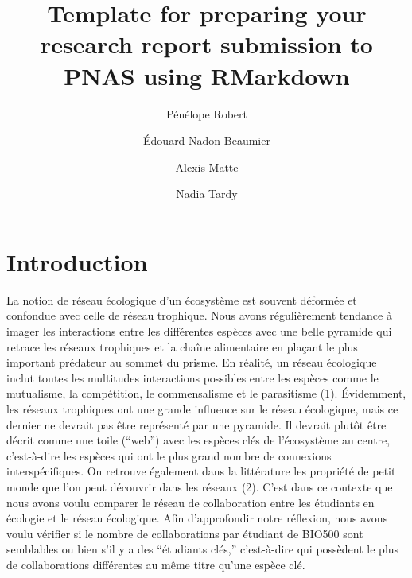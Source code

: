 \documentclass[9pt,twocolumn,twoside,]{pnas-new}
\title{Template for preparing your research report submission to PNAS
using RMarkdown}
\author[a]{Pénélope Robert}
\author[a]{Édouard Nadon-Beaumier}
\author[a]{Alexis Matte}
\author[a]{Nadia Tardy}
\affil[a]{Université de Sherbrooke, Départment de bio, 2500 Boulevard
de l'Université, Sherbrooke, Québec, G1V 0A9}
\begin{document}
\verticaladjustment{-2pt}



\maketitle
\thispagestyle{firststyle}


\acknow{}

\hypertarget{introduction}{%
\section{Introduction}\label{introduction}}

La notion de réseau écologique d'un écosystème est souvent déformée et
confondue avec celle de réseau trophique. Nous avons régulièrement
tendance à imager les interactions entre les différentes espèces avec
une belle pyramide qui retrace les réseaux trophiques et la chaîne
alimentaire en plaçant le plus important prédateur au sommet du prisme.
En réalité, un réseau écologique inclut toutes les multitudes
interactions possibles entre les espèces comme le mutualisme, la
compétition, le commensalisme et le parasitisme (1). Évidemment, les
réseaux trophiques ont une grande influence sur le réseau écologique,
mais ce dernier ne devrait pas être représenté par une pyramide. Il
devrait plutôt être décrit comme une toile (``web'') avec les espèces
clés de l'écosystème au centre, c'est-à-dire les espèces qui ont le plus
grand nombre de connexions interspécifiques. On retrouve également dans
la littérature les propriété de petit monde que l'on peut découvrir dans
les réseaux (2). C'est dans ce contexte que nous avons voulu comparer le
réseau de collaboration entre les étudiants en écologie et le réseau
écologique. Afin d'approfondir notre réflexion, nous avons voulu
vérifier si le nombre de collaborations par étudiant de BIO500 sont
semblables ou bien s'il y a des ``étudiants clés,'' c'est-à-dire qui
possèdent le plus de collaborations différentes au même titre qu'une
espèce clé.
\end{document}
